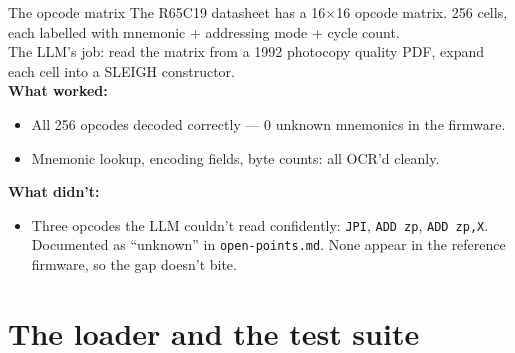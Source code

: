 \documentclass[aspectratio=169,11pt]{beamer}
\begin{document}
\begin{frame}{The opcode matrix}
The R65C19 datasheet has a 16$\times$16 opcode matrix. 256 cells, each
labelled with mnemonic + addressing mode + cycle count.\\[0.4em]

The LLM's job: read the matrix from a 1992 photocopy quality PDF,
expand each cell into a SLEIGH constructor.\\[0.4em]

\textbf{What worked:}
\begin{itemize}
  \item All 256 opcodes decoded correctly --- 0 unknown mnemonics in the firmware.
  \item Mnemonic lookup, encoding fields, byte counts: all OCR'd cleanly.
\end{itemize}

\textbf{What didn't:}
\begin{itemize}
  \item Three opcodes the LLM couldn't read confidently:
        \texttt{JPI}, \texttt{ADD zp}, \texttt{ADD zp,X}.\\
        Documented as ``unknown'' in \texttt{open-points.md}. None
        appear in the reference firmware, so the gap doesn't bite.
\end{itemize}
\end{frame}

\section{The loader and the test suite}
\end{document}
